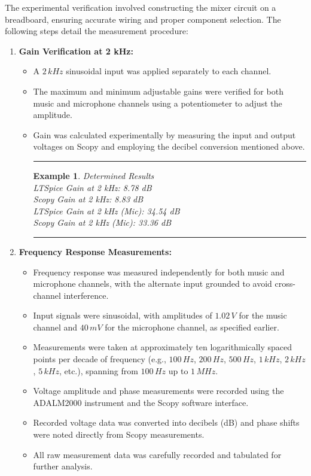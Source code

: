 \documentclass[12pt]{article}
\newtheorem{example}{Example}
\newenvironment{examp}
{\vspace{0.5cm}
 \hrule
\vspace{0.5cm}
\begin{example}}
{\hrule
\vspace{0.5cm}
\end{example}}
\begin{document}
The experimental verification involved constructing the mixer circuit on a breadboard, ensuring accurate wiring and proper component selection. The following steps detail the measurement procedure:

\begin{enumerate}
	\item \textbf{Gain Verification at 2 kHz:}
	      \begin{itemize}
		      \item A $2\,kHz$ sinusoidal input was applied separately to each channel.
		      \item The maximum and minimum adjustable gains were verified for both music and microphone channels using a potentiometer to adjust the amplitude.
		      \item Gain was calculated experimentally by measuring the input and
		            output voltages on Scopy and employing the decibel conversion
		            mentioned above.\\
		            \begin{examp}
			            Determined Results\\
			            LTSpice Gain at 2 kHz: 8.78 dB\\
			            Scopy Gain at 2 kHz: 8.83 dB\\
			            LTSpice Gain at 2 kHz (Mic): 34.54 dB\\
			            Scopy Gain at 2 kHz (Mic): 33.36 dB\\
		            \end{examp}
	      \end{itemize}

	\item \textbf{Frequency Response Measurements:}
	      \begin{itemize}
		      \item Frequency response was measured independently for both music and microphone channels, with the alternate input grounded to avoid cross-channel interference.
		      \item Input signals were sinusoidal, with amplitudes of $1.02\,V$ for the music channel and $40\,mV$ for the microphone channel, as specified earlier.
		      \item Measurements were taken at approximately ten logarithmically spaced points per decade of frequency (e.g., $100\,Hz$, $200\,Hz$, $500\,Hz$, $1\,kHz$, $2\,kHz$, $5\,kHz$, etc.), spanning from $100\,Hz$ up to $1\,MHz$.
		      \item Voltage amplitude and phase measurements were recorded using the ADALM2000 instrument and the Scopy software interface.
		      \item Recorded voltage data was converted into decibels (dB) and phase shifts were noted directly from Scopy measurements.
		      \item All raw measurement data was carefully recorded and tabulated for further analysis.
	      \end{itemize}
\end{enumerate}
\end{document}
